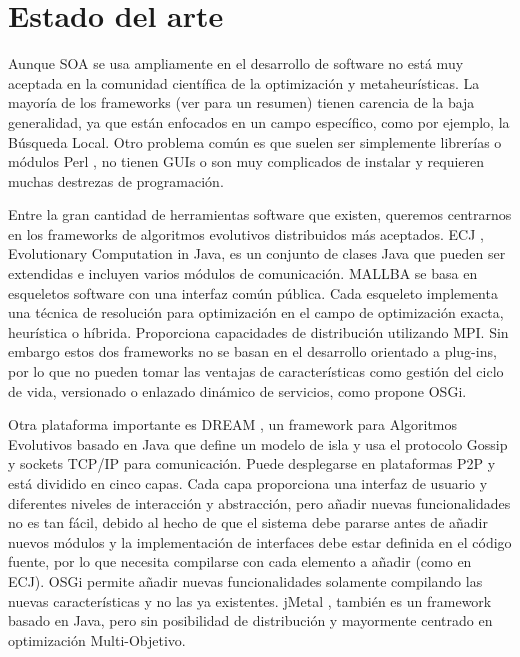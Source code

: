 \documentclass[runningheads]{llncs}
\begin{document}
\section{Estado del arte}
\label{sec:soa}

Aunque SOA se usa ampliamente en el desarrollo de software no está muy aceptada en la comunidad científica de la optimización y metaheurísticas. La mayoría de los frameworks (ver \cite{SURVEY} para un resumen) tienen carencia de la baja generalidad, ya que están enfocados en un campo específico, como por ejemplo, la Búsqueda Local. Otro problema común es que suelen ser simplemente librerías o módulos Perl \cite{PERL}, no tienen GUIs o son muy complicados de instalar y requieren muchas destrezas de programación. %

Entre la gran cantidad de herramientas software que existen, queremos centrarnos en los frameworks de algoritmos evolutivos distribuidos más aceptados. ECJ \cite{ECJ}, Evolutionary Computation in Java, es un conjunto de clases Java que pueden ser extendidas e incluyen varios módulos de comunicación. MALLBA \cite{MALLBA} se basa en esqueletos software con una interfaz común pública. Cada esqueleto implementa una técnica de resolución para optimización en el campo de optimización exacta, heurística o híbrida. Proporciona capacidades de distribución utilizando MPI. Sin embargo estos dos frameworks no se basan en el desarrollo orientado a plug-ins, por lo que no pueden tomar las ventajas de características como gestión del ciclo de vida, versionado o enlazado dinámico de servicios, como propone OSGi.

Otra plataforma importante es DREAM \cite{DREAM}, un framework para
Algoritmos Evolutivos basado en Java que define un modelo de isla y
usa el protocolo Gossip y sockets TCP/IP para comunicación. Puede
desplegarse en plataformas P2P y está dividido en cinco capas. Cada
capa proporciona una interfaz de usuario y diferentes niveles de
interacción y abstracción, pero añadir nuevas funcionalidades no es
tan fácil, debido al hecho de que el sistema debe pararse antes de
añadir nuevos módulos y la implementación de interfaces debe estar
definida en el código fuente, por lo que necesita compilarse con cada
elemento a añadir (como en ECJ). OSGi permite añadir nuevas
funcionalidades solamente compilando las nuevas características y no
las ya existentes. jMetal \cite{JMETAL},  también es un framework
basado en Java, pero sin posibilidad de distribución y mayormente
centrado en optimización Multi-Objetivo. %
\end{document}
